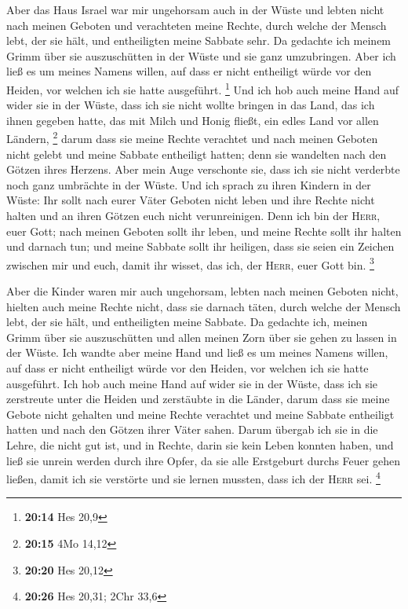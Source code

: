  Aber das Haus Israel war mir ungehorsam auch in der
Wüste und lebten nicht nach meinen Geboten und verachteten meine Rechte,
durch welche der Mensch lebt, der sie hält, und entheiligten meine
Sabbate sehr. Da gedachte ich meinem Grimm über sie auszuschütten in der
Wüste und sie ganz umzubringen.  Aber ich ließ es um
meines Namens willen, auf dass er nicht entheiligt würde vor den Heiden,
vor welchen ich sie hatte ausgeführt. \footnote{\textbf{20:14} Hes 20,9}
 Und ich hob auch meine Hand auf wider sie in der Wüste,
dass ich sie nicht wollte bringen in das Land, das ich ihnen gegeben
hatte, das mit Milch und Honig fließt, ein edles Land vor allen Ländern,
\footnote{\textbf{20:15} 4Mo 14,12}  darum dass sie meine
Rechte verachtet und nach meinen Geboten nicht gelebt und meine Sabbate
entheiligt hatten; denn sie wandelten nach den Götzen ihres Herzens.
 Aber mein Auge verschonte sie, dass ich sie nicht
verderbte noch ganz umbrächte in der Wüste.  Und ich
sprach zu ihren Kindern in der Wüste: Ihr sollt nach eurer Väter Geboten
nicht leben und ihre Rechte nicht halten und an ihren Götzen euch nicht
verunreinigen.  Denn ich bin der \textsc{Herr}, euer
Gott; nach meinen Geboten sollt ihr leben, und meine Rechte sollt ihr
halten und darnach tun;  und meine Sabbate sollt ihr
heiligen, dass sie seien ein Zeichen zwischen mir und euch, damit ihr
wisset, das ich, der \textsc{Herr}, euer Gott bin. \footnote{\textbf{20:20}
  Hes 20,12}

 Aber die Kinder waren mir auch ungehorsam, lebten nach
meinen Geboten nicht, hielten auch meine Rechte nicht, dass sie darnach
täten, durch welche der Mensch lebt, der sie hält, und entheiligten
meine Sabbate. Da gedachte ich, meinen Grimm über sie auszuschütten und
allen meinen Zorn über sie gehen zu lassen in der Wüste. 
Ich wandte aber meine Hand und ließ es um meines Namens willen, auf dass
er nicht entheiligt würde vor den Heiden, vor welchen ich sie hatte
ausgeführt.  Ich hob auch meine Hand auf wider sie in der
Wüste, dass ich sie zerstreute unter die Heiden und zerstäubte in die
Länder,  darum dass sie meine Gebote nicht gehalten und
meine Rechte verachtet und meine Sabbate entheiligt hatten und nach den
Götzen ihrer Väter sahen.  Darum übergab ich sie in die
Lehre, die nicht gut ist, und in Rechte, darin sie kein Leben konnten
haben,  und ließ sie unrein werden durch ihre Opfer, da
sie alle Erstgeburt durchs Feuer gehen ließen, damit ich sie verstörte
und sie lernen mussten, dass ich der \textsc{Herr} sei. \footnote{\textbf{20:26}
  Hes 20,31; 2Chr 33,6}

